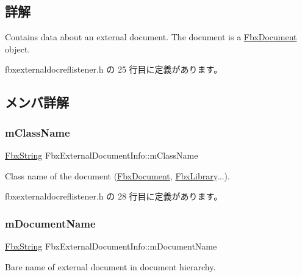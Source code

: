 \subsection{詳解}
Contains data about an external document. The document is a \hyperlink{class_fbx_document}{Fbx\+Document} object. 

 fbxexternaldocreflistener.\+h の 25 行目に定義があります。



\subsection{メンバ詳解}
\mbox{\label{struct_fbx_external_document_info_a0dcde2cfd81d268f174c54c7eed46b8b}} 
\subsubsection{\texorpdfstring{m\+Class\+Name}{mClassName}}
{\footnotesize\ttfamily \hyperlink{class_fbx_string}{Fbx\+String} Fbx\+External\+Document\+Info\+::m\+Class\+Name}



Class name of the document (\hyperlink{class_fbx_document}{Fbx\+Document}, \hyperlink{class_fbx_library}{Fbx\+Library}...). 



 fbxexternaldocreflistener.\+h の 28 行目に定義があります。

\mbox{\label{struct_fbx_external_document_info_a3744e27dd1ba48aa66b36c7e896cde89}} 
\subsubsection{\texorpdfstring{m\+Document\+Name}{mDocumentName}}
{\footnotesize\ttfamily \hyperlink{class_fbx_string}{Fbx\+String} Fbx\+External\+Document\+Info\+::m\+Document\+Name}



Bare name of external document in document hierarchy. 



